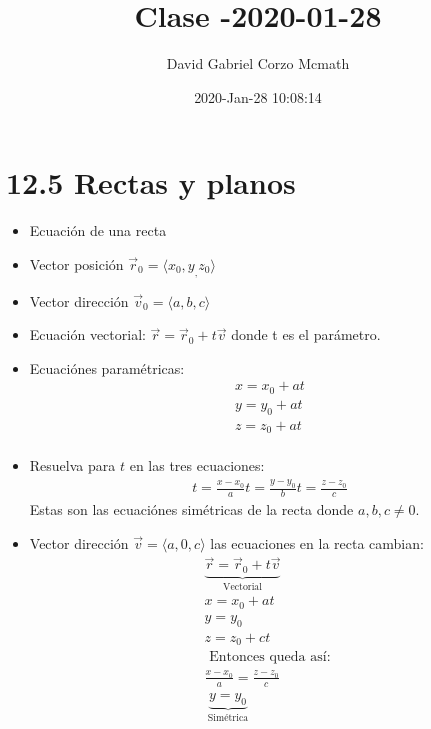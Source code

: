 \documentclass{article}
\title{Clase -2020-01-28}
\author{David Gabriel Corzo Mcmath}
\date{2020-Jan-28 10:08:14}
\begin{document}
\maketitle

\section{12.5 Rectas y planos}
\begin{itemize}
    \item Ecuación de una recta 
    \item Vector posición $\vec{r}_0  = \langle x_0,y_,z_0 \rangle $
    \item Vector dirección $\vec{v}_0 = \langle a,b,c \rangle$
    \item Ecuación vectorial: $\vec{r} = \vec{r}_0 + t\vec{v}$ donde t es el parámetro.
    \item Ecuaciónes paramétricas: \begin{align*}
        x = x_0 +at \\ 
        y = y_0+ at \\ 
        z = z_0+at \\ 
    \end{align*}
    
    \item Resuelva para $t$ en las tres ecuaciones:  
        \begin{align*}
            t = \frac{x-x_0}{a} 
            t = \frac{y-y_0}{b} 
            t = \frac{z-z_0}{c} 
        \end{align*}
        Estas son las ecuaciónes simétricas de la recta donde $a,b,c \neq 0$.
        
        \item Vector dirección $\vec{v}= \langle a,0,c \rangle $ las ecuaciones en la recta cambian:
            \begin{align*}
                \underbrace{\vec{r} = \vec{r}_0 + t \vec{v}}_{\text{  Vectorial  }} \\ 
                x = x_0+at \\ 
                y = y_0 \\ 
                z = z_0 +ct \\ 
                \text{  Entonces queda así:  } \\ 
                \frac{x-x_0}{a} = \frac{z-z_0}{c} \\ 
                \underbrace{y = y_0}_{\text{  Simétrica  }} \\   
            \end{align*}
\end{itemize}
\end{document}
